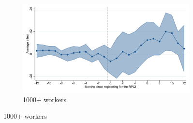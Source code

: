 \begin{figure}[H]
    \begin{subfigure}{0.32\textwidth}
    \caption{1000+ workers}
    \includegraphics[width=\textwidth]{04_Figures/muestra_10porciento/event_study_log_sal_cierre_size_1001_dcdh_connected.pdf}
    \end{subfigure}
    
\end{figure}



%
%
%

%




% 